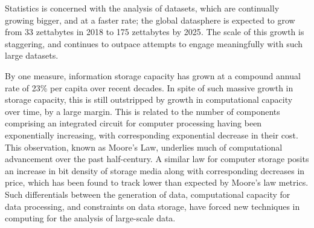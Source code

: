 Statistics is concerned with the analysis of datasets, which are continually growing bigger, and at a faster rate;
the global datasphere is expected to grow from 33 zettabytes in 2018 to 175 zettabytes by 2025\cite{rydning2018digitization}.
The scale of this growth is staggering, and continues to outpace attempts to engage meaningfully with such large datasets.

By one measure, information storage capacity has grown at a compound annual rate of 23\% per capita over recent decades\cite{hilbert2011world}.
In spite of such massive growth in storage capacity, this is still outstripped by growth in computational capacity over time, by a large margin\cite{fontana2018moore}.
This is related to the number of components comprising an integrated circuit for computer processing having been exponentially increasing, with corresponding exponential decrease in their cost\cite{moore1975progress}.
This observation, known as Moore's Law, underlies much of computational advancement over the past half-century.
A similar law for computer storage posits an increase in bit density of storage media along with corresponding decreases in price, which has been found to track lower than expected by Moore's law metrics.
Such differentials between the generation of data, computational capacity for data processing, and constraints on data storage, have forced new techniques in computing for the analysis of large-scale data.\\

